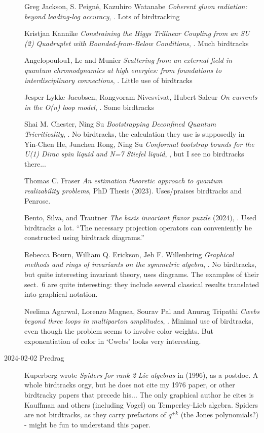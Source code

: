 \begin{description}
Greg Jackson, S. Peign\'e, Kazuhiro Watanabe
{\em Coherent gluon radiation: beyond leading-log accuracy},
.
Lots of birdtracking

Kristjan Kannike
{\em Constraining the Higgs Trilinear Coupling
from an SU (2) Quadruplet
with Bounded-from-Below Conditions},
.
Much birdtracks

Angelopoulou1, Le and Munier
{\em Scattering from an external field in quantum chromodynamics at
high energies: from foundations to interdisciplinary connections},
.
Little use of birdtracks


Jesper Lykke Jacobsen, Rongvoram Nivesvivat, Hubert Saleur
{\em On currents in the O(n) loop model},
.
Some birdtracks


Shai M. Chester, Ning Su
{\em Bootstrapping Deconfined Quantum Tricriticality},
.
No birdtracks, the calculation they use is supposedly in
Yin-Chen He, Junchen Rong, Ning Su
{\em Conformal bootstrap bounds for the U(1) Dirac spin liquid and N=7 Stiefel liquid},
,
but I see no birdtracks there...

Thomas C. Fraser
{\em An estimation theoretic approach to quantum realizability problems},
{PhD Thesis} (2023).
Uses/praises birdtracks and Penrose.


Bento, Silva, and Trautner
{\em The basis invariant flavor puzzle} (2024),
.
Used birdtracks a lot.
``The necessary projection operators can conveniently be constructed
using birdtrack diagrams.''

Rebecca Bourn, William Q. Erickson, Jeb F. Willenbring
{\em Graphical methods and rings of invariants on the symmetric algebra},
.
No birdtracks, but quite interesting invariant theory, uses diagrams.
The examples of their sect.~6 are quite interesting: they include several
classical results translated into graphical notation.

Neelima Agarwal, Lorenzo Magnea, Sourav Pal and Anurag Tripathi
{\em Cwebs beyond three loops in multiparton amplitudes},
.
Minimal use of birdtracks, even though the problem seems to involve color weights.
But exponentiation of color in `Cwebs' looks very interesting.



\item[2024-02-02 Predrag]
Kuperberg wrote {\em Spiders for rank 2 {Lie} algebras}
in (1996), as a postdoc. A whole birdtracks orgy, but he does not cite my
1976 paper, or other birdtracky papers that precede his... The
only graphical author he cites is Kauffman and others (including Vogel)
on Temperley-Lieb algebra. Spiders are not birdtracks, as they carry
prefactors of $q^{\pm k}$ (the Jones polynomials?) -
might be fun to understand this paper.


\end{description}
